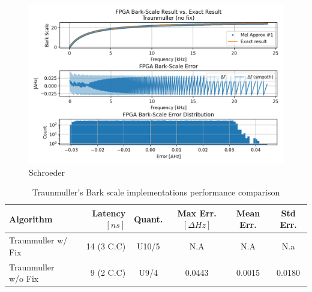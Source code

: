 \begin{figure}[H]
    \centering
    \includegraphics[width=0.75\linewidth]{Scaling/images/bark_traunmuller_no_fix}
    \caption{Schroeder}\label{fig:bark_traunmuller_no_fix}
\end{figure}

\begin{table}[H]
    \hspace*{-1.8cm}
\begin{tabular}{ !{\color{mtblborder}\vrule}l!{\color{mtblborder}\vrule}rcccc| } 
    \hline

    \hline
     \color{white}\bf{Algorithm} 
    & \color{white}\bf{Latency \([ns]\)}  
    & \color{white}\bf{Quant.} 
    & \color{white}\bf{Max Err. \([\Delta Hz]\)}
    & \color{white}\bf{Mean Err.}
    & \color{white}\bf{Std Err.} \\
    \hline

    \hline
     Traunmuller w/ Fix   & 14 (3 C.C) & U10/5 & N.A & N.A & N.a \\
    \hline
    
    \hline
     Traunmuller w/o Fix  & 9 (2 C.C) &  U9/4  & 0.0443 & 0.0015 & 0.0180 \\
    \hline

    \hline
\end{tabular}
\caption{Traunmuller's Bark scale implementations performance comparison}
\label{tbl:bark_implementations_performance}
\end{table}


